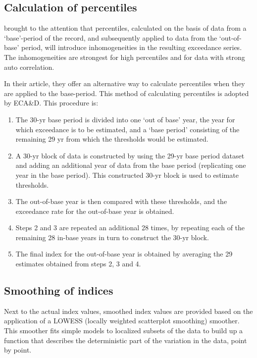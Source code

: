 \documentclass[a4paper,11pt]{article}
\begin{document}
\subsection{Calculation of percentiles}
\citet{zhang:05} brought to the attention that 
percentiles, calculated on the basis of data from a `base'-period of the record, and subsequently applied
to data from the `out-of-base' period, will introduce inhomogeneities in the resulting exceedance series.
The inhomogeneities are strongest for high percentiles and for data with strong auto correlation.

In their article, they offer an alternative way to calculate percentiles when they are applied to the
base-period. This method of calculating percentiles is adopted by ECA\&D. This procedure is:~\citep[\S 4]{zhang:05}
\begin{enumerate}
\item The 30-yr base period is divided into one `out of base' year, the year for which exceedance is to be estimated,
and a `base period' consisting of the remaining 29 yr from which the thresholds would be estimated.
\item A 30-yr block of data is constructed by using the 29-yr base period dataset and adding an additional
year of data from the base period (replicating one year in the base period). This constructed 30-yr block
 is used to estimate thresholds. 
\item The out-of-base year is then compared with these thresholds, and the exceedance rate for the out-of-base year is obtained.
\item Steps 2 and 3 are repeated an additional 28 times, by repeating each of the remaining 28 in-base years in turn
to construct the 30-yr block.
\item The final index for the out-of-base year is obtained by averaging the 29 estimates obtained from steps 2, 3 and 4.
\end{enumerate}

\subsection{Smoothing of indices}
Next to the actual index values, smoothed index values are provided based on the application of a LOWESS 
(locally weighted scatterplot smoothing) smoother. This smoother fits simple models to localized subsets 
of the data to build up a function that describes the deterministic part of the variation in the data, point by point.
\end{document}
